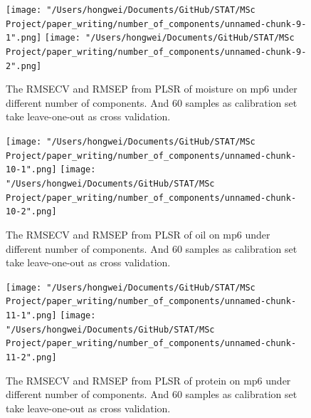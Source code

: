 \documentclass[a4paper,12pt,titlepage]{article} %
\numberwithin{equation}{section}  %
\begin{document}
\begin{appendices}
	
	
	\begin{figure}[h]    %
		\centering           %
		\texttt{[image: "/Users/hongwei/Documents/GitHub/STAT/MSc Project/paper\_writing/number\_of\_components/unnamed-chunk-9-1".png]}  %
		\texttt{[image: "/Users/hongwei/Documents/GitHub/STAT/MSc Project/paper\_writing/number\_of\_components/unnamed-chunk-9-2".png]}  %
		\caption{The RMSECV and RMSEP from PLSR of moisture on mp6 under different number of components. And 60 samples as calibration set take leave-one-out as cross validation.}          %
		\label{fig:components_9-1}               %
	\end{figure}                        %
	
	
	\begin{figure}[h]    %
		\centering           %
		\texttt{[image: "/Users/hongwei/Documents/GitHub/STAT/MSc Project/paper\_writing/number\_of\_components/unnamed-chunk-10-1".png]}  %
		\texttt{[image: "/Users/hongwei/Documents/GitHub/STAT/MSc Project/paper\_writing/number\_of\_components/unnamed-chunk-10-2".png]}  %
		\caption{The RMSECV and RMSEP from PLSR of oil on mp6 under different number of components. And 60 samples as calibration set take leave-one-out as cross validation.}          %
		\label{fig:components_10-1}               %
	\end{figure}                        %
	
	
	
	\begin{figure}[h]    %
		\centering           %
		\texttt{[image: "/Users/hongwei/Documents/GitHub/STAT/MSc Project/paper\_writing/number\_of\_components/unnamed-chunk-11-1".png]}  %
		\texttt{[image: "/Users/hongwei/Documents/GitHub/STAT/MSc Project/paper\_writing/number\_of\_components/unnamed-chunk-11-2".png]}  %
		\caption{The RMSECV and RMSEP from PLSR of protein on mp6 under different number of components. And 60 samples as calibration set take leave-one-out as cross validation.}          %
		\label{fig:components_11-1}               %
	\end{figure}                        %
	

\end{appendices}
\end{document}
